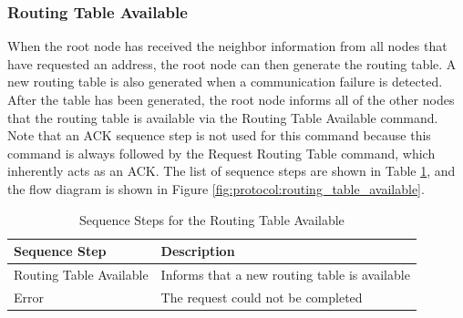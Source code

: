 \subsubsection{Routing Table Available}\label{ref:protocol:methodology:commands:routing_table_available}

When the root node has received the neighbor information from all nodes that have requested an address, the root node can then generate the routing table. A new routing table is also generated when a communication failure is detected. After the table has been generated, the root node informs all of the other nodes that the routing table is available via the Routing Table Available command. Note that an ACK sequence step is not used for this command because this command is always followed by the Request Routing Table command, which inherently acts as an ACK. The list of sequence steps are shown in Table \ref{tab:protocol:routing_table_available}, and the flow diagram is shown in Figure \ref{fig:protocol:routing_table_available}.

\begin{table}
	\begin{center}
		\setlength{\extrarowheight}{1.5pt}
		\caption{Sequence Steps for the Routing Table Available}
		\vspace{0.1cm}
		\begin{tabular}{|l|l|}
			\hline
			\textbf{Sequence Step} & \textbf{Description} \\
			\hline
			\hline
			Routing Table Available & Informs that a new routing table is available \\
			\hline
			Error & The request could not be completed \\
			\hline
		\end{tabular}
		\label{tab:protocol:routing_table_available}
	\end{center}
\end{table}

